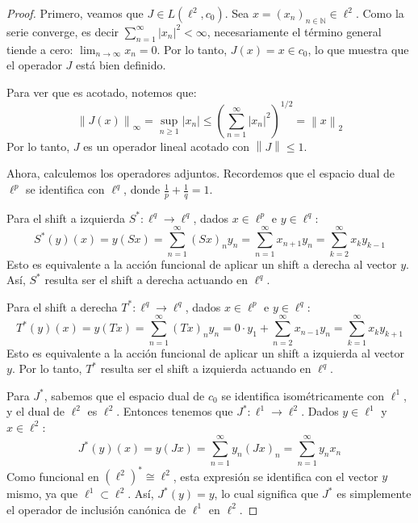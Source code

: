 \documentclass{article}
\theoremstyle{definition}
\newcommand{\N}{\mathbb{N}}
\newcommand{\norm}[1]{\left\lVert #1 \right\rVert}       %
\begin{document}
\begin{proof}
	Primero, veamos que \( J \in L(\ell^2, c_0) \). Sea \( x = {(x_n)}_{n \in \N} \in \ell^2 \). Como la serie converge, es decir \( \sum_{n=1}^{\infty} |x_n|^2 < \infty \), necesariamente el término general tiende a cero: \( \lim_{n \to \infty} x_n = 0 \). Por lo tanto, \( J(x) = x \in c_0 \), lo que muestra que el operador \( J \) está bien definido.

	Para ver que es acotado, notemos que:
	\[ \norm{J(x)}_{\infty} = \sup_{n \ge 1} |x_n| \le {\left( \sum_{n=1}^{\infty} |x_n|^2 \right)}^{1/2} = \norm{x}_2 \]
	Por lo tanto, \( J \) es un operador lineal acotado con \( \norm{J} \le 1 \).

	Ahora, calculemos los operadores adjuntos. Recordemos que el espacio dual de \( \ell^p \) se identifica con \( \ell^q \), donde \( \frac{1}{p} + \frac{1}{q} = 1 \).

	Para el shift a izquierda \( S^*: \ell^q \to \ell^q \), dados \( x \in \ell^p \) e \( y \in \ell^q \):
	\[ S^*(y)(x) = y(Sx) = \sum_{n=1}^{\infty} (Sx)_n y_n = \sum_{n=1}^{\infty} x_{n+1} y_n = \sum_{k=2}^{\infty} x_k y_{k-1} \]
	Esto es equivalente a la acción funcional de aplicar un shift a derecha al vector \( y \). Así, \( S^* \) resulta ser el shift a derecha actuando en \( \ell^q \).

	Para el shift a derecha \( T^*: \ell^q \to \ell^q \), dados \( x \in \ell^p \) e \( y \in \ell^q \):
	\[ T^*(y)(x) = y(Tx) = \sum_{n=1}^{\infty} {(Tx)}_n y_n = 0 \cdot y_1 + \sum_{n=2}^{\infty} x_{n-1} y_n = \sum_{k=1}^{\infty} x_k y_{k+1} \]
	Esto es equivalente a la acción funcional de aplicar un shift a izquierda al vector \( y \). Por lo tanto, \( T^* \) resulta ser el shift a izquierda actuando en \( \ell^q \).

	Para \( J^* \), sabemos que el espacio dual de \( c_0 \) se identifica isométricamente con \( \ell^1 \), y el dual de \( \ell^2 \) es \( \ell^2 \). Entonces tenemos que \( J^*: \ell^1 \to \ell^2 \).
	Dados \( y \in \ell^1 \) y \( x \in \ell^2 \):
	\[ J^*(y)(x) = y(Jx) = \sum_{n=1}^{\infty} y_n {(Jx)}_n = \sum_{n=1}^{\infty} y_n x_n \]
	Como funcional en \( (\ell^2)^* \cong \ell^2 \), esta expresión se identifica con el vector \( y \) mismo, ya que \( \ell^1 \subset \ell^2 \). Así, \( J^*(y) = y \), lo cual significa que \( J^* \) es simplemente el operador de inclusión canónica de \( \ell^1 \) en \( \ell^2 \).
\end{proof}

\vspace{0.5cm}
\end{document}
